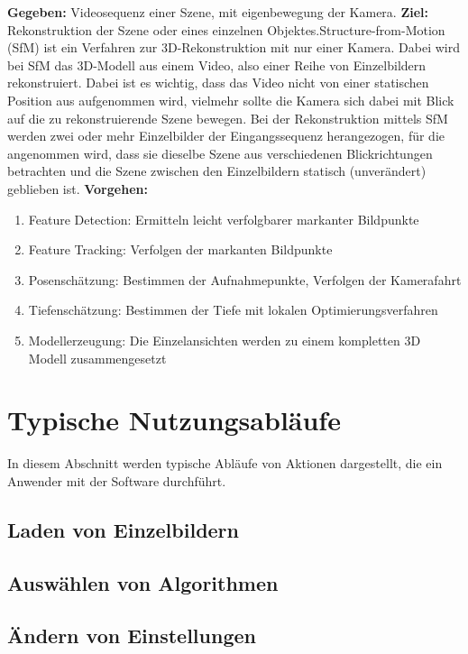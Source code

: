 \textbf{Gegeben:}\newline
Videosequenz einer Szene, mit eigenbewegung der Kamera.\newline
\textbf{Ziel:}\newline
Rekonstruktion der Szene oder eines einzelnen Objektes.\newline Structure-from-Motion (SfM) ist ein Verfahren zur 3D-Rekonstruktion mit nur einer Kamera. Dabei wird bei SfM das 3D-Modell aus einem Video, also einer Reihe von Einzelbildern rekonstruiert. Dabei ist es wichtig, dass das Video nicht von einer statischen Position aus aufgenommen wird, vielmehr sollte die Kamera sich dabei mit Blick auf die zu rekonstruierende Szene bewegen. Bei der Rekonstruktion mittels SfM werden zwei oder mehr Einzelbilder der Eingangssequenz herangezogen, für die angenommen wird, dass sie dieselbe Szene aus verschiedenen Blickrichtungen betrachten und die Szene zwischen den Einzelbildern statisch (unverändert) geblieben ist.\newline
\textbf{Vorgehen:}
\begin{enumerate}
\item Feature Detection: Ermitteln leicht verfolgbarer markanter Bildpunkte\item Feature Tracking: Verfolgen der markanten Bildpunkte\item Posenschätzung: Bestimmen der Aufnahmepunkte, Verfolgen der Kamerafahrt\item Tiefenschätzung: Bestimmen der Tiefe mit lokalen Optimierungsverfahren\item Modellerzeugung: Die Einzelansichten werden zu einem kompletten 3D Modell zusammengesetzt
\end{enumerate}

\section{Typische Nutzungsabläufe}
\label{ch:usecases}
In diesem Abschnitt werden typische Abläufe von Aktionen dargestellt, die ein Anwender mit der Software durchführt.
\subsection{Laden von Einzelbildern}
\label{usecase:1}
\subsection{Auswählen von Algorithmen}
\label{usecase:2}
\subsection{Ändern von Einstellungen}
\label{usecase:3}
